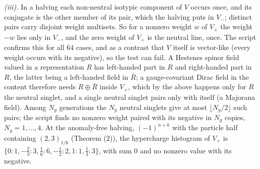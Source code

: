 \emph{(iii).} In a halving each non-neutral isotypic component of $V$ occurs once, and its conjugate is the other member of its pair, which the halving puts in $V_{-}$; distinct pairs carry disjoint weight multisets. So for a nonzero weight $w$ of $V_{+}$ the weight $-w$ lies only in $V_{-}$, and the zero weight of $V_{+}$ is the neutral line, once. The script confirms this for all $64$ cases, and as a contrast that $V$ itself is vector-like (every weight occurs with its negative), so the test can fail. A Hestenes spinor field valued in a representation $R$ has left-handed part in $R$ and right-handed part in $R$, the latter being a left-handed field in $\bar{R}$; a gauge-covariant Dirac field in the content therefore needs $R \oplus \bar{R}$ inside $V_{+}$, which by the above happens only for $R$ the neutral singlet, and a single neutral singlet pairs only with itself (a Majorana field). Among $N_{g}$ generations the $N_{g}$ neutral singlets give at most $\lfloor N_{g}/2 \rfloor$ such pairs; the script finds no nonzero weight paired with its negative in $N_{g}$ copies, $N_{g} = 1, \dots, 4$. At the anomaly-free halving, $(-1)^{n + k}$ with the particle half containing $(2,3)_{1/6}$ (Theorem (2)), the hypercharge histogram of $V_{+}$ is $\{0: 1, -\tfrac23: 3, \tfrac16: 6, -\tfrac12: 2, 1: 1, \tfrac13: 3\}$, with sum $0$ and no nonzero value with its negative.

